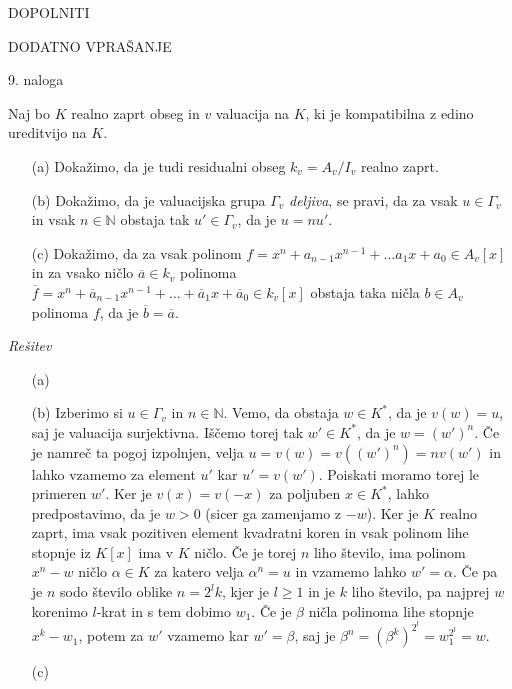 \documentclass[a4paper, 12pt]{article}
\newcommand{\N}{\mathbb{N}}
\begin{document}
\begin{enumerate}
DOPOLNITI

DODATNO VPRAŠANJE

\end{enumerate}

\begin{flushleft}
9. naloga
\end{flushleft}
Naj bo $K$ realno zaprt obseg in $v$ valuacija na $K$, ki je kompatibilna z edino ureditvijo na $K$. 
\begin{enumerate}
\item[(a)] Dokažimo, da je tudi residualni obseg $k_v = A_v / I_v$ realno zaprt.
\item[(b)] Dokažimo, da je valuacijska grupa $\Gamma_v$ \emph{deljiva}, se pravi, da za vsak $u \in \Gamma_v$ in vsak $n\in \N$ obstaja tak $u' \in \Gamma_v$, da je $u = nu'$.
\item[(c)] Dokažimo, da za vsak polinom $f=x^n + a_{n-1} x^{n-1} + \dots a_1 x + a_0 \in A_v[x]$ in za vsako ničlo $\overline{a} \in k_v$ polinoma  $\overline{f} =x^n + \overline{a}_{n-1} x^{n-1} + \dots +\overline{a}_1 x + \overline{a}_0 \in k_v[x]$ obstaja taka ničla $b\in A_v$ polinoma $f$, da je $\overline{b} = \overline{a}$.
\end{enumerate}
\emph{Rešitev}
\begin{enumerate}
\item[(a)] 

\item[(b)] Izberimo si $u\in \Gamma_v$ in $n\in \N$. Vemo, da obstaja $w\in K^*$, da je $v(w) = u$, saj je valuacija surjektivna. Iščemo torej tak $w'\in K^*$, da je $w = (w')^n$. Če je namreč ta pogoj izpolnjen, velja $u = v(w)=  v((w')^n) = nv(w')$ in lahko vzamemo za element $u'$ kar $u'=v(w')$. Poiskati moramo torej le primeren $w'$. Ker je $v(x) = v(-x)$ za poljuben $x\in K^*$, lahko predpostavimo, da je $w > 0$ (sicer ga zamenjamo z $-w$). Ker je $K$ realno zaprt, ima vsak pozitiven element kvadratni koren in vsak polinom lihe stopnje iz $K[x]$ ima v $K$ ničlo. Če je torej $n$ liho število, ima polinom $x^n - w$ ničlo $\alpha \in K$ za katero velja $\alpha^n = u$ in vzamemo lahko $w' = \alpha$. Če pa je $n$ sodo število oblike $n = 2^l k$, kjer je $l\ge 1$ in je $k$ liho število, pa najprej $w$ korenimo $l$-krat in s tem dobimo $w_1$. Če je $ \beta $ ničla polinoma lihe stopnje $x^k - w_1$, potem za $w'$ vzamemo kar $w' = \beta$, saj je $\beta^n = (\beta^k ) ^{2^l}   = w_1^{2^l} = w$. 

\item[(c)]

\end{enumerate}
\end{document}
